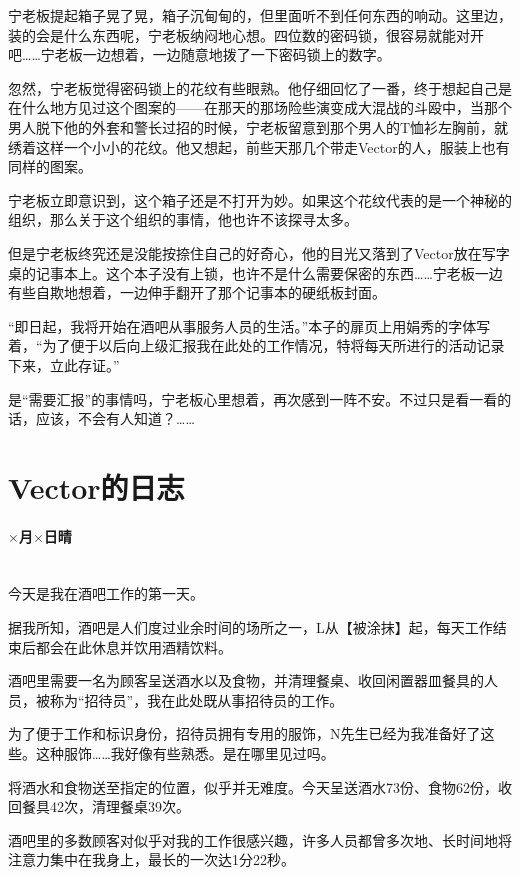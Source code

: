 宁老板提起箱子晃了晃，箱子沉甸甸的，但里面听不到任何东西的响动。这里边，装的会是什么东西呢，宁老板纳闷地心想。四位数的密码锁，很容易就能对开吧……宁老板一边想着，一边随意地拨了一下密码锁上的数字。

忽然，宁老板觉得密码锁上的花纹有些眼熟。他仔细回忆了一番，终于想起自己是在什么地方见过这个图案的——在那天的那场险些演变成大混战的斗殴中，当那个男人脱下他的外套和警长过招的时候，宁老板留意到那个男人的T恤衫左胸前，就绣着这样一个小小的花纹。他又想起，前些天那几个带走Vector的人，服装上也有同样的图案。

宁老板立即意识到，这个箱子还是不打开为妙。如果这个花纹代表的是一个神秘的组织，那么关于这个组织的事情，他也许不该探寻太多。

但是宁老板终究还是没能按捺住自己的好奇心，他的目光又落到了Vector放在写字桌的记事本上。这个本子没有上锁，也许不是什么需要保密的东西……宁老板一边有些自欺地想着，一边伸手翻开了那个记事本的硬纸板封面。

“即日起，我将开始在酒吧从事服务人员的生活。”本子的扉页上用娟秀的字体写着，“为了便于以后向上级汇报我在此处的工作情况，特将每天所进行的活动记录下来，立此存证。”

是“需要汇报”的事情吗，宁老板心里想着，再次感到一阵不安。不过只是看一看的话，应该，不会有人知道？……



\section*{Vector的日志}



\paragraph*{$\times$月$\times$日\quad 晴}\mbox{}\\

今天是我在酒吧工作的第一天。

据我所知，酒吧是人们度过业余时间的场所之一，L从【被涂抹】起，每天工作结束后都会在此休息并饮用酒精饮料。

酒吧里需要一名为顾客呈送酒水以及食物，并清理餐桌、收回闲置器皿餐具的人员，被称为“招待员”，我在此处既从事招待员的工作。

为了便于工作和标识身份，招待员拥有专用的服饰，N先生已经为我准备好了这些。这种服饰……我好像有些熟悉。是在哪里见过吗。

将酒水和食物送至指定的位置，似乎并无难度。今天呈送酒水73份、食物62份，收回餐具42次，清理餐桌39次。

酒吧里的多数顾客对似乎对我的工作很感兴趣，许多人员都曾多次地、长时间地将注意力集中在我身上，最长的一次达1分22秒。

